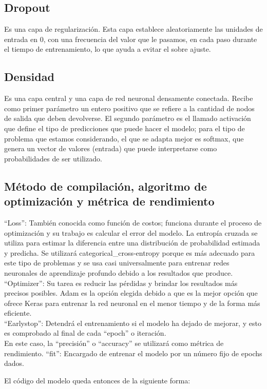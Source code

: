 \documentclass[12pt, a4paper, titlepage]{article}
\begin{document}
	\subsection{Dropout}
	Es una capa de regularización. Esta capa establece aleatoriamente las unidades de entrada en 0, con una frecuencia del valor que le pasamos, en cada paso durante el tiempo de entrenamiento, lo que ayuda a evitar el sobre ajuste.
	\begin{center}
		
	\end{center}
	\subsection{Densidad}
	Es una capa central y una capa de red neuronal densamente conectada. Recibe como primer parámetro un entero positivo que se refiere a la cantidad de nodos de salida que deben devolverse. El segundo parámetro es el llamado activación que define el tipo de predicciones que puede hacer el modelo; para el tipo de problema que estamos considerando, el que se adapta mejor es softmax, que genera un vector de valores (entrada) que puede interpretarse como probabilidades de ser utilizado.
	\begin{center}
		
	\end{center}
	\subsection{Método de compilación, algoritmo de optimización y métrica de rendimiento}
	“Loss”: También conocida como función de costos; funciona durante el proceso de optimización y su trabajo es calcular el error del modelo. La entropía cruzada se utiliza para estimar la diferencia entre una distribución de probabilidad estimada y predicha. Se utilizará categorical\_cross-entropy porque es más adecuado para este tipo de problemas y se usa casi universalmente para entrenar redes neuronales de aprendizaje profundo debido a los resultados que produce.\\
	“Optimizer”: Su tarea es reducir las pérdidas y brindar los resultados más precisos posibles. Adam es la opción elegida debido a que es la mejor opción que ofrece Keras para entrenar la red neuronal en el menor tiempo y de la forma más eficiente.\\
	“Earlystop”: Detendrá el entrenamiento si el modelo ha dejado de mejorar, y esto es comprobado al final de cada “epoch” o iteración.\\
	En este caso, la “precisión” o “accuracy” se utilizará como métrica de rendimiento.
	“fit”: Encargado de entrenar el modelo por un número fijo de epochs dados.	
	\begin{center}
		
	\end{center}
	El código del modelo queda entonces de la siguiente forma:
	\begin{center}
		
	\end{center}
\end{document}
